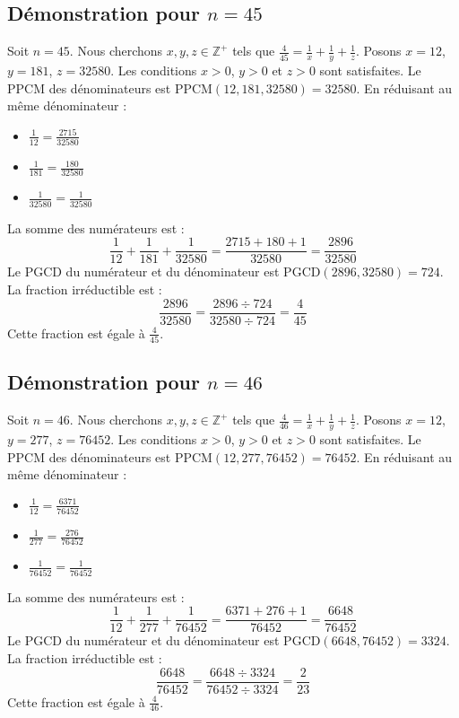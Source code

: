 \documentclass[11pt,a4paper]{article}
\begin{document}
\subsection{Démonstration pour $n = 45$}
Soit $n = 45$. Nous cherchons $x, y, z \in \mathbb{Z}^{+}$ tels que $\frac{4}{45} = \frac{1}{x} + \frac{1}{y} + \frac{1}{z}$.
Posons $x = 12$, $y = 181$, $z = 32580$.
Les conditions $x > 0$, $y > 0$ et $z > 0$ sont satisfaites.
Le PPCM des dénominateurs est $\text{PPCM}(12, 181, 32580) = 32580$.
En réduisant au même dénominateur :
\begin{itemize}
    \item $\frac{1}{12} = \frac{2715}{32580}$
    \item $\frac{1}{181} = \frac{180}{32580}$
    \item $\frac{1}{32580} = \frac{1}{32580}$
\end{itemize}
La somme des numérateurs est :
$$ \frac{1}{12} + \frac{1}{181} + \frac{1}{32580} = \frac{2715 + 180 + 1}{32580} = \frac{2896}{32580} $$
Le PGCD du numérateur et du dénominateur est $\text{PGCD}(2896, 32580) = 724$.
La fraction irréductible est :
$$ \frac{2896}{32580} = \frac{2896 \div 724}{32580 \div 724} = \frac{4}{45} $$
Cette fraction est égale à $\frac{4}{45}$.

\subsection{Démonstration pour $n = 46$}
Soit $n = 46$. Nous cherchons $x, y, z \in \mathbb{Z}^{+}$ tels que $\frac{4}{46} = \frac{1}{x} + \frac{1}{y} + \frac{1}{z}$.
Posons $x = 12$, $y = 277$, $z = 76452$.
Les conditions $x > 0$, $y > 0$ et $z > 0$ sont satisfaites.
Le PPCM des dénominateurs est $\text{PPCM}(12, 277, 76452) = 76452$.
En réduisant au même dénominateur :
\begin{itemize}
    \item $\frac{1}{12} = \frac{6371}{76452}$
    \item $\frac{1}{277} = \frac{276}{76452}$
    \item $\frac{1}{76452} = \frac{1}{76452}$
\end{itemize}
La somme des numérateurs est :
$$ \frac{1}{12} + \frac{1}{277} + \frac{1}{76452} = \frac{6371 + 276 + 1}{76452} = \frac{6648}{76452} $$
Le PGCD du numérateur et du dénominateur est $\text{PGCD}(6648, 76452) = 3324$.
La fraction irréductible est :
$$ \frac{6648}{76452} = \frac{6648 \div 3324}{76452 \div 3324} = \frac{2}{23} $$
Cette fraction est égale à $\frac{4}{46}$.
\end{document}
